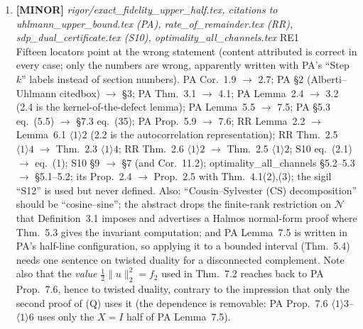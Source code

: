 \documentclass[11pt]{article}
\begin{document}
\begin{enumerate}[leftmargin=1.6em,itemsep=6pt]
\item \textbf{[MINOR]} \emph{rigor/exact\_fidelity\_upper\_half.tex, citations to uhlmann\_upper\_bound.tex (PA), rate\_of\_remainder.tex (RR), sdp\_dual\_certificate.tex (S10), optimality\_all\_channels.tex} \hfill\textsc{RE1}\\ Fifteen locators point at the wrong statement (content attributed is correct in every case; only the numbers are wrong, apparently written with PA's ``Step \(k\)'' labels instead of section numbers). PA Cor.~1.9 \(\to\) 2.7; PA \S2 (Alberti--Uhlmann citedbox) \(\to\) \S3; PA Thm.~3.1 \(\to\) 4.1; PA Lemma~2.4 \(\to\) 3.2 (2.4 is the kernel-of-the-defect lemma); PA Lemma~5.5 \(\to\) 7.5; PA \S5.3 eq.~(5.5) \(\to\) \S7.3 eq.~(35); PA Prop.~5.9 \(\to\) 7.6; RR Lemma~2.2 \(\to\) Lemma~6.1 \(\langle1\rangle2\) (2.2 is the autocorrelation representation); RR Thm.~2.5 \(\langle1\rangle4\) \(\to\) Thm.~2.3 \(\langle1\rangle4\); RR Thm.~2.6 \(\langle1\rangle2\) \(\to\) Thm.~2.5 \(\langle1\rangle2\); S10 eq.~(2.1) \(\to\) eq.~(1); S10 \S9 \(\to\) \S7 (and Cor.~11.2); optimality\_all\_channels \S5.2--5.3 \(\to\) \S5.1--5.2; its Prop.~2.4 \(\to\) Prop.~2.5 with Thm.~4.1(2),(3); the sigil ``S12'' is used but never defined. Also: ``Cousin--Sylvester (CS) decomposition'' should be ``cosine--sine''; the abstract drops the finite-rank restriction on \(\mathcal N\) that Definition~3.1 imposes and advertises a Halmos normal-form proof where Thm.~5.3 gives the invariant computation; and PA Lemma~7.5 is written in PA's half-line configuration, so applying it to a bounded interval (Thm.~5.4) needs one sentence on twisted duality for a disconnected complement. Note also that the \emph{value} \(\frac12\lVert u\rVert_2^2=f_2\) used in Thm.~7.2 reaches back to PA Prop.~7.6, hence to twisted duality, contrary to the impression that only the second proof of (Q) uses it (the dependence is removable: PA Prop.~7.6 \(\langle1\rangle3\)--\(\langle1\rangle6\) uses only the \(X=I\) half of PA Lemma~7.5).
\end{enumerate}
\end{document}
